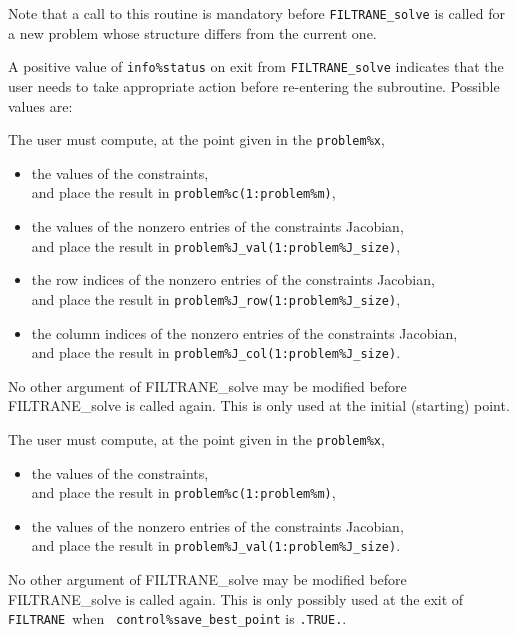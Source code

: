 \documentclass{galahad}
\newcommand{\packagename}{FILTRANE}
\newcommand{\filtrane}{{\tt \packagename}}
\begin{document}
\noindent
Note that a call to this routine is mandatory before {\tt \packagename\_solve}
is called for a new problem whose structure differs from the current
one.


\galreverse

A positive value of {\tt info\%status} on exit from
{\tt \packagename\_solve} indicates that the user needs to take appropriate
action before re-entering the subroutine. Possible values are:

\begin{description}

 The user must compute, at the point given in the {\tt problem\%x},
\begin{itemize}
\item the values of the constraints, \\
      and place the result in {\tt problem\%c(1:problem\%m)},
\item the values of the nonzero entries of the constraints Jacobian, \\
      and place the result in {\tt problem\%J\_val(1:problem\%J\_size)},
\item the row indices of the nonzero entries of the constraints Jacobian, \\
      and place the result in {\tt problem\%J\_row(1:problem\%J\_size)},
\item the column indices of the nonzero entries of the constraints Jacobian,\\
      and place the result in {\tt problem\%J\_col(1:problem\%J\_size)}.
\end{itemize}
No other argument of \packagename\_solve may be modified
before \packagename\_solve is called again.
This is only used at the initial (starting) point.

 The user must compute, at the point given in the {\tt problem\%x},
\begin{itemize}
\item the values of the constraints, \\
      and place the result in {\tt problem\%c(1:problem\%m)},
\item the values of the nonzero entries of the constraints Jacobian, \\
      and place the result in {\tt problem\%J\_val(1:problem\%J\_size)}.
\end{itemize}
No other argument of \packagename\_solve may be modified
before \packagename\_solve is called again.
This is only possibly used at the exit of \filtrane\ when {\tt
control\%save\_best\_point} is {\tt .TRUE.}.



\end{description}
\end{document}
